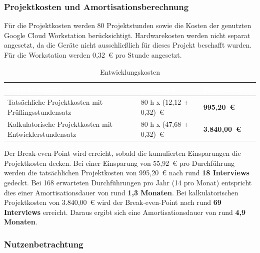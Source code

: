 \documentclass[
  10pt,
  ngerman,
  a4paper,
  toc=graduated,
  numbers=noenddot,
  headings=standardclasses,
  nonumberlist
]{scrartcl}
\begin{document}
\subsubsection{Projektkosten und Amortisationsberechnung}
\label{projektkosten_und_amortisationsberechnung}

Für die Projektkosten werden 80 Projektstunden sowie die Kosten der genutzten Google Cloud Workstation berücksichtigt. Hardwarekosten werden nicht separat angesetzt, da die Geräte nicht ausschließlich für dieses Projekt beschafft wurden. Für die Workstation werden 0,32~\euro{} pro Stunde \cite{google_workstations_pricing_2026} angesetzt.

\begin{table}[h]
\centering
\begin{tabularx}{\textwidth}{|Y|R{3.0cm}|R{3.0cm}|}
\hline
{}
\textcolor{white}{\textbf{Berechnungsart}} 
& \textcolor{white}{\textbf{Rechnung}} 
& \textcolor{white}{\textbf{Projektkosten}} \\
\hline

Tatsächliche Projektkosten mit Prüflingsstundensatz 
& 80 h x (12,12 + 0,32)~\euro{}
& \textbf{995,20~\euro{}} \\
\hline

Kalkulatorische Projektkosten mit Entwicklerstundensatz 
& 80 h x (47,68 +  0,32)~\euro{} 
& \textbf{3.840,00~\euro{}} \\
\hline

\end{tabularx}
\caption{Entwicklungskosten}
\label{tab:entwicklungskosten}
\end{table}

Der Break-even-Point wird erreicht, sobald die kumulierten Einsparungen die Projektkosten decken. Bei einer Einsparung von 55,92~\euro{} pro Durchführung werden die tatsächlichen Projektkosten von 995,20~\euro{} nach rund \textbf{18 Interviews} gedeckt. Bei 168 erwarteten Durchführungen pro Jahr (14 pro Monat) entspricht dies einer Amortisationsdauer von rund \textbf{1,3 Monaten}. Bei kalkulatorischen Projektkosten von 3.840,00~\euro{} wird der Break-even-Point nach rund \textbf{69 Interviews} erreicht. Daraus ergibt sich eine Amortisationsdauer von rund \textbf{4,9 Monaten}.

\subsubsection{Nutzenbetrachtung}
\label{nutzenbetrachtung}
\end{document}
